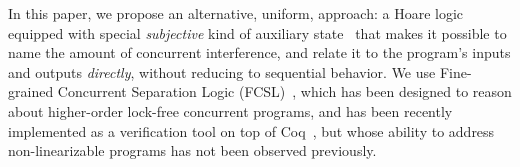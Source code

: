 In this paper, we propose an alternative, uniform, approach: a Hoare
logic equipped with special \emph{subjective} kind of auxiliary
state~\cite{LeyWild-Nanevski:POPL13} that makes it possible to name
the amount of concurrent interference, and relate it to the program's
inputs and outputs \emph{directly}, without reducing to sequential
behavior. We use Fine-grained Concurrent Separation Logic
(FCSL)~\cite{Nanevski-al:ESOP14}, which has been designed to reason
about higher-order lock-free concurrent programs, and has been
recently implemented as a verification tool on top of
Coq~\cite{Sergey-al:PLDI15}, but whose ability to address
non-linearizable programs has not been observed previously.
%
%
%
%
%
